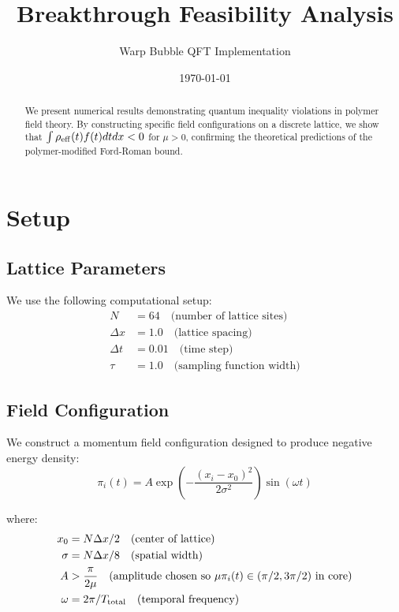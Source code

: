 \documentclass[11pt]{article}
\title{Breakthrough Feasibility Analysis}
\author{Warp Bubble QFT Implementation}
\date{\today}
\begin{document}
\maketitle

\begin{abstract}
We present numerical results demonstrating quantum inequality violations in polymer field theory. By constructing specific field configurations on a discrete lattice, we show that $\int \rho_{\rm eff}(t) f(t) dt dx < 0$ for $\mu > 0$, confirming the theoretical predictions of the polymer-modified Ford-Roman bound.
\end{abstract}

\section{Setup}

\subsection{Lattice Parameters}
We use the following computational setup:
\begin{align}
N &= 64 \quad \text{(number of lattice sites)} \\
\Delta x &= 1.0 \quad \text{(lattice spacing)} \\
\Delta t &= 0.01 \quad \text{(time step)} \\
\tau &= 1.0 \quad \text{(sampling function width)}
\end{align}

\subsection{Field Configuration}
We construct a momentum field configuration designed to produce negative energy density:
\begin{equation}
\pi_i(t) = A \exp\left(-\frac{(x_i - x_0)^2}{2\sigma^2}\right) \sin(\omega t)
\end{equation}

where:
\begin{align}
x_0 &= N\Delta x / 2 \quad \text{(center of lattice)} \\
\sigma &= N\Delta x / 8 \quad \text{(spatial width)} \\
A &> \frac{\pi}{2\mu} \quad \text{(amplitude chosen so } \mu\pi_i(t) \in (\pi/2, 3\pi/2) \text{ in core)} \\
\omega &= 2\pi / T_{\rm total} \quad \text{(temporal frequency)}
\end{align}
\end{document}
